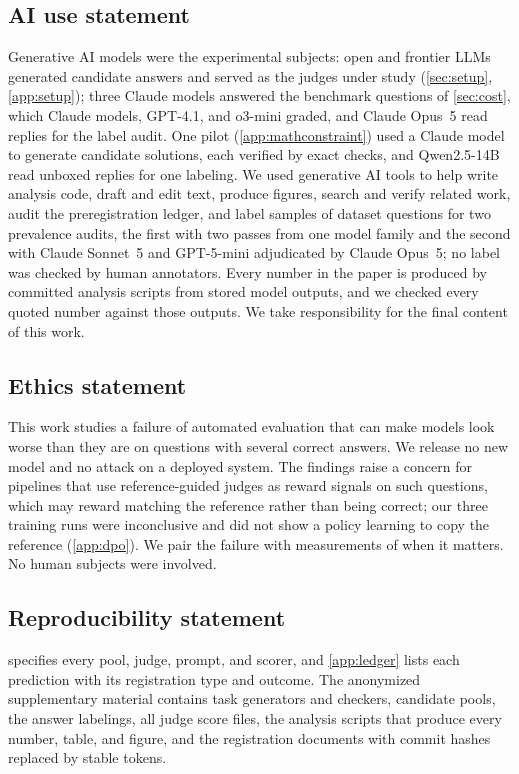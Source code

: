 \documentclass{article}
\begin{document}
\subsection*{AI use statement}
Generative AI models were the experimental subjects: open and frontier LLMs generated candidate answers and served as the judges under study (\cref{sec:setup}, \cref{app:setup}); three Claude models answered the benchmark questions of \cref{sec:cost}, which Claude models, GPT-4.1, and o3-mini graded, and Claude Opus~5 read replies for the label audit. One pilot (\cref{app:mathconstraint}) used a Claude model to generate candidate solutions, each verified by exact checks, and Qwen2.5-14B read unboxed replies for one labeling. We used generative AI tools to help write analysis code, draft and edit text, produce figures, search and verify related work, audit the preregistration ledger, and label samples of dataset questions for two prevalence audits, the first with two passes from one model family and the second with Claude Sonnet~5 and GPT-5-mini adjudicated by Claude Opus~5; no label was checked by human annotators. Every number in the paper is produced by committed analysis scripts from stored model outputs, and we checked every quoted number against those outputs. We take responsibility for the final content of this work.

\subsection*{Ethics statement}
This work studies a failure of automated evaluation that can make models look worse than they are on questions with several correct answers. We release no new model and no attack on a deployed system. The findings raise a concern for pipelines that use reference-guided judges as reward signals on such questions, which may reward matching the reference rather than being correct; our three training runs were inconclusive and did not show a policy learning to copy the reference (\cref{app:dpo}). We pair the failure with measurements of when it matters. No human subjects were involved.

\subsection*{Reproducibility statement}
 specifies every pool, judge, prompt, and scorer, and \cref{app:ledger} lists each prediction with its registration type and outcome. The anonymized supplementary material contains task generators and checkers, candidate pools, the answer labelings, all judge score files, the analysis scripts that produce every number, table, and figure, and the registration documents with commit hashes replaced by stable tokens.




\newpage
\appendix
{}

\end{document}

